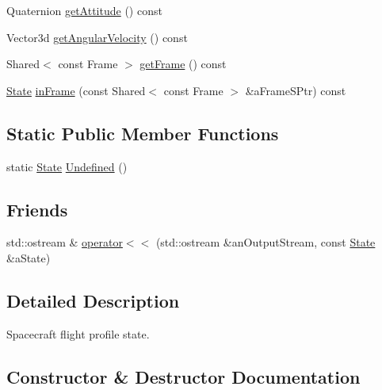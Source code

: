 \begin{DoxyCompactItemize}
Quaternion \hyperlink{classostk_1_1astro_1_1flight_1_1profile_1_1_state_a8b765a7ebcfc0a7202bce31cafbc3a30}{get\+Attitude} () const
\item 
Vector3d \hyperlink{classostk_1_1astro_1_1flight_1_1profile_1_1_state_acd3702013017327ab64023ff86d1c3c2}{get\+Angular\+Velocity} () const
\item 
Shared$<$ const Frame $>$ \hyperlink{classostk_1_1astro_1_1flight_1_1profile_1_1_state_a6e06bfcca971466bf36c2c0a0837e429}{get\+Frame} () const
\item 
\hyperlink{classostk_1_1astro_1_1flight_1_1profile_1_1_state}{State} \hyperlink{classostk_1_1astro_1_1flight_1_1profile_1_1_state_ab5f93d12e52218cc6d5684a5a9519b87}{in\+Frame} (const Shared$<$ const Frame $>$ \&a\+Frame\+S\+Ptr) const
\end{DoxyCompactItemize}
\subsection*{Static Public Member Functions}
\begin{DoxyCompactItemize}
\item 
static \hyperlink{classostk_1_1astro_1_1flight_1_1profile_1_1_state}{State} \hyperlink{classostk_1_1astro_1_1flight_1_1profile_1_1_state_af18b40557aa14bfd0b46d14ad04d33fc}{Undefined} ()
\end{DoxyCompactItemize}
\subsection*{Friends}
\begin{DoxyCompactItemize}
\item 
std\+::ostream \& \hyperlink{classostk_1_1astro_1_1flight_1_1profile_1_1_state_abba03f039f2534d691a1dc28426e8b89}{operator$<$$<$} (std\+::ostream \&an\+Output\+Stream, const \hyperlink{classostk_1_1astro_1_1flight_1_1profile_1_1_state}{State} \&a\+State)
\end{DoxyCompactItemize}


\subsection{Detailed Description}
Spacecraft flight profile state. 

\subsection{Constructor \& Destructor Documentation}
\mbox{\label{classostk_1_1astro_1_1flight_1_1profile_1_1_state_ac6e83efb0a774d9cbdb94c02ee17d87b}} 
